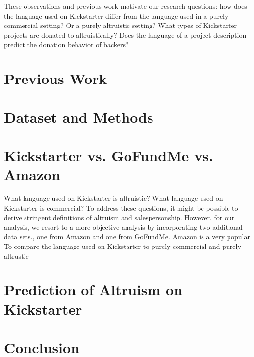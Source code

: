 \documentclass[letterpaper]{article}
\begin{document}
These observations and previous work motivate our research questions: how does the language used on Kickstarter differ from the language used in a purely commercial setting? Or a purely altruistic setting? What types of Kickstarter projects are donated to altruistically? Does the language of a project description predict the donation behavior of backers?

\section{Previous Work}

\section{Dataset and Methods}

\section{Kickstarter vs. GoFundMe vs. Amazon}
What language used on Kickstarter is altruistic? What language used on Kickstarter is commercial? To address these questions, it might be possible to derive stringent definitions of altruism and salespersonship. However, for our analysis, we resort to a more objective analysis by incorporating two additional data sets., one from Amazon and one from GoFundMe. Amazon is a very popular  To compare the language used on Kickstarter to purely commercial and purely altrustic 

\section{Prediction of Altruism on Kickstarter}

\section{Conclusion}

 
\end{document}
